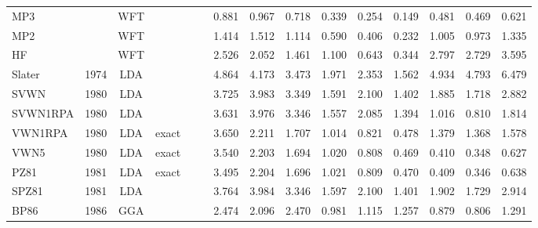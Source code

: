 \begin{landscape}
\begin{longtable}{lc:cccc:rrr:rrr:rrr}
    MP3              &      & WFT  &          &             &           & 0.881             & 0.967             & 0.718  & 0.339              & 0.254             & 0.149  & 0.481   & 0.469 & 0.621 \\
    MP2              &      & WFT  &          &             &           & 1.414             & 1.512             & 1.114  & 0.590              & 0.406             & 0.232  & 1.005   & 0.973 & 1.335 \\
    HF               &      & WFT  &          &             &           & 2.526             & 2.052             & 1.461  & 1.100              & 0.643             & 0.344  & 2.797   & 2.729 & 3.595 \\
    Slater           & 1974 & LDA  &          &             &           & 4.864             & 4.173             & 3.473  & 1.971              & 2.353             & 1.562  & 4.934   & 4.793 & 6.479 \\
    SVWN             & 1980 & LDA  &          &             &           & 3.725             & 3.983             & 3.349  & 1.591              & 2.100             & 1.402  & 1.885   & 1.718 & 2.882 \\
    SVWN1RPA         & 1980 & LDA  &          &             &           & 3.631             & 3.976             & 3.346  & 1.557              & 2.085             & 1.394  & 1.016   & 0.810 & 1.814 \\
    VWN1RPA          & 1980 & LDA  & exact    &             &           & 3.650             & 2.211             & 1.707  & 1.014              & 0.821             & 0.478  & 1.379   & 1.368 & 1.578 \\
    VWN5             & 1980 & LDA  & exact    &             &           & 3.540             & 2.203             & 1.694  & 1.020              & 0.808             & 0.469  & 0.410   & 0.348 & 0.627 \\
    PZ81             & 1981 & LDA  & exact    &             &           & 3.495             & 2.204             & 1.696  & 1.021              & 0.809             & 0.470  & 0.409   & 0.346 & 0.638 \\
    SPZ81            & 1981 & LDA  &          &             &           & 3.764             & 3.984             & 3.346  & 1.597              & 2.100             & 1.401  & 1.902   & 1.729 & 2.914 \\
    BP86             & 1986 & GGA  &          &             &           & 2.474             & 2.096             & 2.470  & 0.981              & 1.115             & 1.257  & 0.879   & 0.806 & 1.291 \\

\end{longtable}
\end{landscape}
